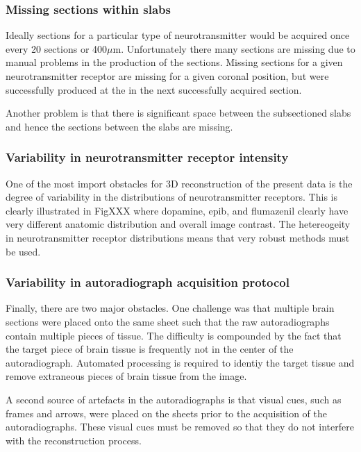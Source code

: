 \documentclass[12pt]{article}
\begin{document}
\subsubsection{Missing sections within slabs}

Ideally sections for a particular type of neurotransmitter would be acquired once every 20 sections or 400$\mu$m. Unfortunately there many sections are missing due to manual problems in the production of the sections. Missing sections for a given neurotransmitter receptor are missing for a given coronal position, but were successfully produced at the in the next successfully acquired section.

Another problem is that there is significant space between the subsectioned slabs and hence the sections between the slabs are missing.

\subsubsection{Variability in neurotransmitter receptor intensity}

One of the most import obstacles for 3D reconstruction of the present data is the degree of variability in the distributions of neurotransmitter receptors. This is clearly illustrated in FigXXX where dopamine, epib, and flumazenil clearly have very different anatomic distribution and overall image contrast. The hetereogeity in neurotransmitter receptor distributions means that very robust methods must be used.

\subsubsection{Variability in autoradiograph acquisition protocol }

Finally, there are two major obstacles. One challenge was that multiple brain sections were placed onto the same sheet such that the raw autoradiographs contain multiple pieces of tissue. The difficulty is compounded by the fact that the target piece of brain tissue is frequently not in the center of the autoradiograph. Automated processing is required to identiy the target tissue and remove extraneous pieces of brain tissue from the image. 

A second source of artefacts in the autoradiographs is that visual cues, such as frames and arrows, were placed on the sheets prior to the acquisition of the autoradiographs. These visual cues must be removed so that they do not interfere with the reconstruction process. 
\end{document}
